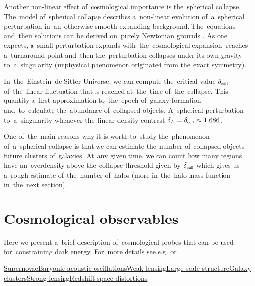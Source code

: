 Another non-linear effect of~cosmological importance is the~spherical collapse. The~model of~spherical collapse describes a~non-linear evolution of~a~spherical perturbation in~an~otherwise smooth expanding background. The~equations and~their solutions can be derived on~purely Newtonian grounds \parencite{2010deto.book.....A}. As one expects, a~small perturbation expands with~the~cosmological expansion, reaches a~turnaround point and~then the~perturbation collapses under its own gravity to~a~singularity (unphysical phenomenon originated from the~exact symmetry).

In~the~Einstein--de Sitter Universe, we can compute the~critical \DIFdelbegin {}\DIFdelend value $\delta_\text{\tiny coll}$ of~the~linear fluctuation that is reached at~the~time of~the~\DIFaddbegin {}\DIFaddend collapse. This quantity \DIFdelbegin {}\DIFdelend \DIFaddbegin {}\DIFaddend a~first approximation to~the~epoch of~galaxy formation and~\DIFaddbegin {}\DIFaddend to~calculate the~abundance of~collapsed objects. A~spherical perturbation \DIFdelbegin {}\DIFdelend \DIFaddbegin {}\DIFaddend to~a~singularity whenever the~linear density contrast $\delta_L=\delta_\text{\tiny coll}\approx1.686$.

One of~the~main reasons why it is worth to~study the~phenomenon of~a~spherical collapse is that we can estimate the~number of~collapsed objects -- future clusters of~galaxies. At~any given time, we can count how many regions have an~overdensity above the~collapse threshold given by $\delta_\text{\tiny coll}$ which gives us a~rough estimate of~the~number of~halos (more in~the~halo mass function in~the~next section).

\section{Cosmological observables}
Here we present a~brief description of~cosmological probes that can be used for~constraining dark energy. For~more details see e.g. \textcite{weinberg_observational_2013}\DIFaddbegin {}\DIFaddend or \textcite{DE_probes2}.

\DIFaddbegin {}\hyperref[ssec:supernovae]{Supernovae}\DIFadd{, }\hyperref[sec:bao]{Baryonic acoustic oscillations}\DIFadd{, }\hyperref[ssec:wl]{Weak lensing}\DIFadd{, }\hyperref[ssec:lss]{Large-scale structure}\DIFadd{, }\hyperref[ssec:gc]{Galaxy clusters}\DIFadd{, }\hyperref[ssec:SL]{Strong lensing}\hyperref[sec:rsd]{Redshift-space distortions}

